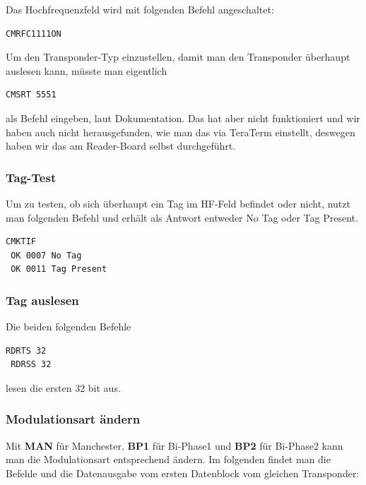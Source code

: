 \documentclass[paper=a4,fontsize=11pt,headsepline,footsepline,parskip=half]{scrartcl}
\begin{document}
Das Hochfrequenzfeld wird mit folgenden Befehl angeschaltet:

\begin{lstlisting}[caption={HF anschalten.}]
 CMRFC1111ON
\end{lstlisting}

Um den Transponder-Typ einzustellen, damit man den Transponder überhaupt auslesen kann, müsste man eigentlich

\begin{lstlisting}[caption={Transponder-Typ einstellen.}]
 CMSRT 5551
\end{lstlisting}

als Befehl eingeben, laut Dokumentation. Das hat aber nicht funktioniert und wir haben auch nicht herausgefunden, wie man das via TeraTerm
einstellt, deswegen haben wir das am Reader-Board selbst durchgeführt.

\subsubsection{Tag-Test}

Um zu testen, ob sich überhaupt ein Tag im HF-Feld befindet oder nicht, nutzt man folgenden Befehl und erhält als Antwort entweder \glqq 
No Tag\grqq{} oder \glqq Tag Present\grqq.

\begin{lstlisting}[caption={Vorhandensein des Tags im HF-Feld testen.}]
 CMKTIF
 OK 0007 No Tag
 OK 0011 Tag Present
\end{lstlisting}

\subsubsection{Tag auslesen}

Die beiden folgenden Befehle

\begin{lstlisting}[caption={Tag auslesen.}]
 RDRTS 32
 RDRSS 32
\end{lstlisting}

lesen die ersten 32 bit aus.

\subsubsection{Modulationsart ändern}

Mit \textbf{MAN} für \glqq Manchester\grqq{}, \textbf{BP1} für \glqq Bi-Phase1\grqq{} und \textbf{BP2} für \glqq Bi-Phase2\grqq{} kann
man die Modulationsart entsprechend ändern. Im folgenden findet man die Befehle und die Datenausgabe vom ersten Datenblock vom gleichen
Transponder:
\end{document}
